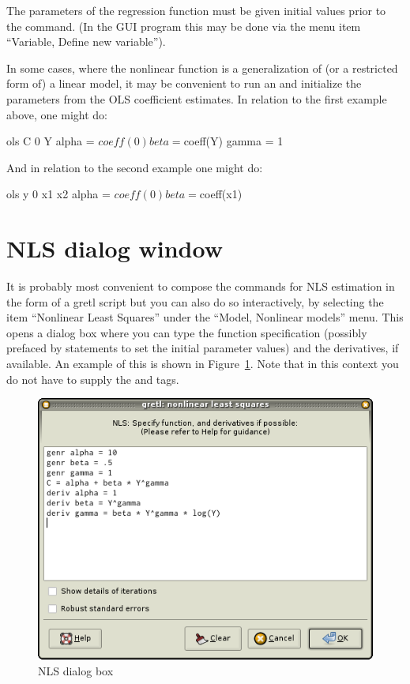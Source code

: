 The parameters of the regression function must be given initial values
prior to the  command. (In the GUI program this may be done
via the menu item ``Variable, Define new variable'').

In some cases, where the nonlinear function is a generalization of (or
a restricted form of) a linear model, it may be convenient to run an
 and initialize the parameters from the OLS coefficient
estimates.  In relation to the first example above, one might do:
%
\begin{code}
ols C 0 Y
alpha = $coeff(0)
beta = $coeff(Y)
gamma = 1
\end{code}

And in relation to the second example one might do:
%
\begin{code}
ols y 0 x1 x2
alpha = $coeff(0)
beta = $coeff(x1)
\end{code}

\section{NLS dialog window}
\label{nls-gui}

It is probably most convenient to compose the commands for NLS
estimation in the form of a gretl script but you can also do so
interactively, by selecting the item ``Nonlinear Least Squares'' under
the ``Model, Nonlinear models'' menu.  This opens a dialog box where
you can type the function specification (possibly prefaced by
statements to set the initial parameter values) and the derivatives,
if available.  An example of this is shown in
Figure~\ref{fig-nls-dialog}.  Note that in this context you do not
have to supply the  and  tags.

\begin{figure}[htbp]
  \begin{center}
    \includegraphics[scale=0.5]{figures/nls_window}
  \end{center}
  \caption{NLS dialog box}
  \label{fig-nls-dialog}
\end{figure}

